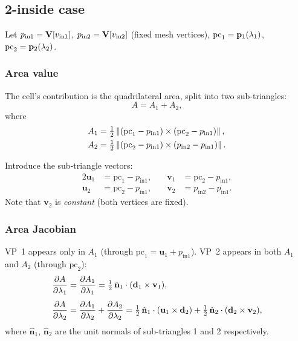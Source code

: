 \documentclass[11pt,a4paper]{article}
\begin{document}
\subsection{2-inside case}
\label{sec:area-2inside}

Let $p_{\mathrm{in}1} = \mathbf{V}[v_{\mathrm{in}1}]$,
$p_{\mathrm{in}2} = \mathbf{V}[v_{\mathrm{in}2}]$ (fixed mesh vertices),
$\mathrm{pc}_1 = \mathbf{p}_{1}(\lambda_1)$, $\mathrm{pc}_2 = \mathbf{p}_{2}(\lambda_2)$.

\subsubsection{Area value}

The cell's contribution is the quadrilateral area, split into two
sub-triangles:
\begin{equation}
  A = A_1 + A_2,
\end{equation}
where
\begin{align}
  A_1 &= \tfrac{1}{2}\left\|(\mathrm{pc}_1 - p_{\mathrm{in}1})
                   \times (\mathrm{pc}_2 - p_{\mathrm{in}1})\right\|,
  \label{eq:A1-2inside} \\
  A_2 &= \tfrac{1}{2}\left\|(\mathrm{pc}_2 - p_{\mathrm{in}1})
                   \times (p_{\mathrm{in}2} - p_{\mathrm{in}1})\right\|.
  \label{eq:A2-2inside}
\end{align}

Introduce the sub-triangle vectors:
\begin{alignat}{2}
  \mathbf{u}_1 &= \mathrm{pc}_1 - p_{\mathrm{in}1}, &\quad
  \mathbf{v}_1 &= \mathrm{pc}_2 - p_{\mathrm{in}1}, \\
  \mathbf{u}_2 &= \mathrm{pc}_2 - p_{\mathrm{in}1}, &\quad
  \mathbf{v}_2 &= p_{\mathrm{in}2} - p_{\mathrm{in}1}.
\end{alignat}
Note that $\mathbf{v}_2$ is \emph{constant} (both vertices are fixed).

\subsubsection{Area Jacobian}

VP~1 appears only in $A_1$ (through $\mathrm{pc}_1 = \mathbf{u}_1 +
p_{\mathrm{in}1}$).  VP~2 appears in both $A_1$ and $A_2$ (through
$\mathrm{pc}_2$):
\begin{align}
  \dfrac{\partial A}{\partial \lambda_1}
    &= \dfrac{\partial A_1}{\partial \lambda_1}
     = \tfrac{1}{2}\,\hat{\mathbf{n}}_1 \cdot (\mathbf{d}_{1} \times \mathbf{v}_1),
  \label{eq:jac2-1} \\[4pt]
  \dfrac{\partial A}{\partial \lambda_2}
    &= \dfrac{\partial A_1}{\partial \lambda_2} + \dfrac{\partial A_2}{\partial \lambda_2}
     = \tfrac{1}{2}\,\hat{\mathbf{n}}_1 \cdot (\mathbf{u}_1 \times \mathbf{d}_{2})
       + \tfrac{1}{2}\,\hat{\mathbf{n}}_2 \cdot (\mathbf{d}_{2} \times \mathbf{v}_2),
  \label{eq:jac2-2}
\end{align}
where $\hat{\mathbf{n}}_1$, $\hat{\mathbf{n}}_2$ are the unit normals of
sub-triangles 1 and 2 respectively.
\end{document}
